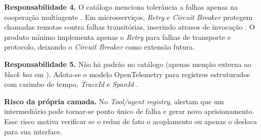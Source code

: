 \textbf{Responsabilidade 4.} O catálogo menciona tolerância a falhas apenas na
cooperação multiagente \cite{liu2025}. Em microsserviços, \textit{Retry} e
\textit{Circuit Breaker} protegem chamadas remotas contra falhas transitórias,
inserindo atrasos de invocação \cite{mendonca2020,sedghpour2022,aderaldo2025}.
O produto mínimo implementa apenas o \textit{Retry} para falhas de transporte e
protocolo, deixando o \textit{Circuit Breaker} como extensão futura.

\textbf{Responsabilidade 5.} Não há padrão no catálogo (apenas menção externa ao
\textit{black box} em ). Adota-se o modelo OpenTelemetry
para registros estruturados com carimbo de tempo, \textit{TraceId} e
\textit{SpanId} \cite{opentelemetrylogs}.

\textbf{Risco da própria camada.} No \textit{Tool/agent registry},
 alertam que um intermediário pode tornar-se ponto único de
falha e gerar novo aprisionamento. Esse risco motiva verificar se o \harness{}
reduz de fato o acoplamento ou apenas o desloca para sua interface.
